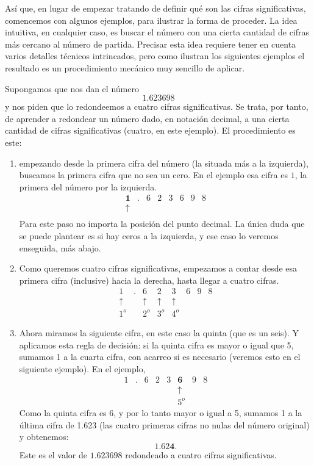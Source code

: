 Así que, en lugar de empezar tratando de definir qué son las cifras significativas, comencemos con algunos ejemplos, para ilustrar la forma de proceder. La idea intuitiva, en cualquier caso, es buscar el número con una cierta cantidad de cifras más cercano al número de partida. Precisar esta idea requiere tener en cuenta varios detalles técnicos intrincados, pero como ilustran los siguientes ejemplos el resultado es un procedimiento mecánico muy sencillo de aplicar.

\begin{Ejemplo}
Supongamos que nos dan el número
\[1.623698\]
y nos piden que lo redondeemos a cuatro cifras significativas. Se trata, por tanto, de aprender a redondear un número dado, en notación decimal, a una cierta cantidad de cifras significativas (cuatro, en este ejemplo). El procedimiento es
este:
\begin{enumerate}
  \item empezando desde la primera cifra del número (la situada más a la izquierda), buscamos la primera cifra que no sea un cero. En el ejemplo esa cifra es $1$, la primera del número por la izquierda.
  \[
    \begin{array}{cccccccc}
      \mathbf{1}&.&6&2&3&6&9&8\\
      \mathbf{\uparrow}\\
    \end{array}
  \]
  Para este paso no importa la posición del punto decimal. La única duda que se puede plantear es si hay ceros a la izquierda, y ese caso lo veremos enseguida, más abajo.
  \item Como queremos cuatro cifras significativas, empezamos a contar desde esa primera cifra (inclusive) hacia la derecha, hasta llegar a  cuatro cifras.
  \[
    \begin{array}{cccccccc}
      1&.&6&2&3&6&9&8\\
      \mathbf{\uparrow}&&\mathbf{\uparrow}&\mathbf{\uparrow}&\mathbf{\uparrow}\\
      1^o&&2^o&3^o&4^o
    \end{array}
  \]
  \item Ahora miramos la siguiente cifra, en este caso la quinta (que es un seis). Y aplicamos esta regla de decisión: si la quinta cifra es mayor o igual que 5, sumamos 1 a la cuarta cifra, con acarreo si es necesario (veremos esto en el siguiente ejemplo). En el ejemplo,
  \[
    \begin{array}{cccccccc}
      1&.&6&2&3&\mathbf{6}&9&8\\
      &&&&&\mathbf{\uparrow}\\
      &&&&&5^o
    \end{array}
  \]
  Como la quinta cifra es 6, y por lo tanto mayor o igual a 5,  sumamos 1 a la última cifra de 1.623 (las cuatro primeras cifras no nulas del número original) y obtenemos:
  \[1.62\mathbf{4}.\]
  Este es el valor de $1.623698$ redondeado a cuatro cifras significativas.
  \end{enumerate}


\end{Ejemplo}
